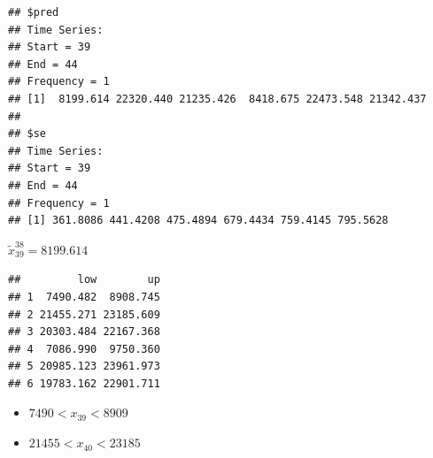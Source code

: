 \documentclass[
]{book}
\newenvironment{Shaded}{\begin{snugshade}}{\end{snugshade}}
\newcommand{\AttributeTok}[1]{\textcolor[rgb]{0.77,0.63,0.00}{#1}}
\newcommand{\CommentTok}[1]{\textcolor[rgb]{0.56,0.35,0.01}{\textit{#1}}}
\newcommand{\DecValTok}[1]{\textcolor[rgb]{0.00,0.00,0.81}{#1}}
\newcommand{\FloatTok}[1]{\textcolor[rgb]{0.00,0.00,0.81}{#1}}
\newcommand{\FunctionTok}[1]{\textcolor[rgb]{0.00,0.00,0.00}{#1}}
\newcommand{\NormalTok}[1]{#1}
\newcommand{\OtherTok}[1]{\textcolor[rgb]{0.56,0.35,0.01}{#1}}
\newcommand{\SpecialCharTok}[1]{\textcolor[rgb]{0.00,0.00,0.00}{#1}}
\theoremstyle{definition}
\theoremstyle{definition}
\theoremstyle{definition}
\theoremstyle{definition}
\theoremstyle{remark}
\begin{document}
\begin{verbatim}
## $pred
## Time Series:
## Start = 39 
## End = 44 
## Frequency = 1 
## [1]  8199.614 22320.440 21235.426  8418.675 22473.548 21342.437
## 
## $se
## Time Series:
## Start = 39 
## End = 44 
## Frequency = 1 
## [1] 361.8086 441.4208 475.4894 679.4434 759.4145 795.5628
\end{verbatim}

\(\tilde x^{38}_{39}=8199.614\)

\begin{Shaded}
\end{Shaded}

\begin{Shaded}
\end{Shaded}

\begin{verbatim}
##         low        up
## 1  7490.482  8908.745
## 2 21455.271 23185.609
## 3 20303.484 22167.368
## 4  7086.990  9750.360
## 5 20985.123 23961.973
## 6 19783.162 22901.711
\end{verbatim}

\begin{itemize}
\item
  \(7490<x_{39}<8909\)
\item
  \(21455<x_{40}<23185\)
\end{itemize}
\end{document}
